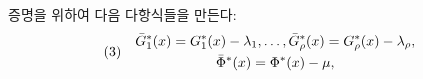 
증명을 위하여 다음 다항식들을 만든다:
\[
\begin{array}{@{}l@{\quad}c@{}}
(3)& \begin{gathered}
\bar G_1^*(x)=G_1^*(x)-\lambda_1,\ldots,\bar G_\rho^*(x)=G_\rho^*(x)-\lambda_\rho,\\
\bar\Phi^*(x)=\Phi^*(x)-\mu,
\end{gathered}
\end{array}
\]
